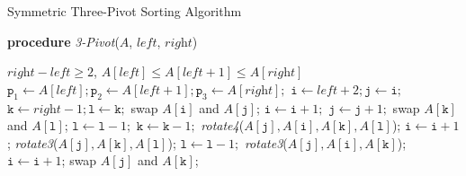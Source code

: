 \documentclass[prodmode,acmtalg]{acmsmall}
\begin{document}
\begin{algorithm}
    \caption{Symmetric Three-Pivot Sorting Algorithm}\samepage\label{algo:three:pivot}
    \textbf{procedure} \textit{3-Pivot}($\textit{A}$, $\textit{left}$, $\textit{right}$)
    \begin{algorithmic}[1]
        \Require $\textit{right} - \textit{left} \geq 2$, 
            $\textit{A}[\textit{left}] \leq \textit{A}[\textit{left} + 1] \leq \textit{A}[\textit{right}]$
        \State $\texttt{p}_1 \gets \textit{A}[\textit{left}]; 
        \texttt{p}_2 \gets \textit{A}[\textit{left} + 1];
        \texttt{p}_3 \gets \textit{A}[\textit{right}];$
        \State $\texttt{i} \gets \textit{left} + 2; \texttt{j} \gets \texttt{i};$
        $\texttt{k} \gets \textit{right} - 1; \texttt{l} \gets \texttt{k};$
                    \State swap $\textit{A}[\texttt{i}]$ and $\textit{A}[\texttt{j}]$;
                    \State $\texttt{i} \gets \texttt{i} + 1;$
                \EndIf
                \State $\texttt{j} \gets \texttt{j} + 1;$
            \EndWhile
                    \State swap $\textit{A}[\texttt{k}]$ and $\textit{A}[\texttt{l}]$;
                    \State $\texttt{l} \gets \texttt{l} - 1;$
                \EndIf
                \State $\texttt{k} \gets \texttt{k} - 1;$
            \EndWhile
                        \State \textit{rotate4}($\textit{A}[\texttt{j}], \textit{A}[\texttt{i}], 
                        \textit{A}[\texttt{k}], \textit{A}[\texttt{l}]$);
                        \State $\texttt{i} \gets \texttt{i} + 1$;
                    \Else
                        \State \textit{rotate3}($\textit{A}[\texttt{j}], 
                         \textit{A}[\texttt{k}], \textit{A}[\texttt{l}]$);
                    \EndIf
                    \State $\texttt{l} \gets \texttt{l} - 1;$
                \Else
                        \State \textit{rotate3}($\textit{A}[\texttt{j}], \textit{A}[\texttt{i}], 
                        \textit{A}[\texttt{k}]$);
                        \State $\texttt{i} \gets \texttt{i} + 1$;
                    \Else
                        \State swap $\textit{A}[\texttt{j}]$ and 
                        $\textit{A}[\texttt{k}]$;

\end{algorithmic}
\end{algorithm}
\end{document}
